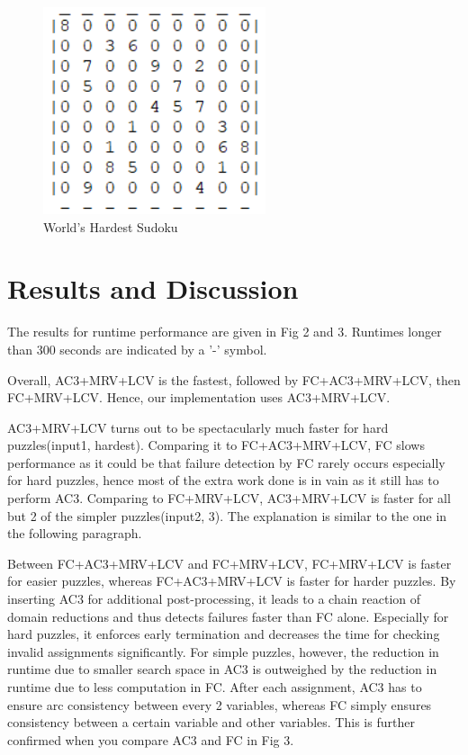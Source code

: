 \documentclass[runningheads]{llncs}
\begin{document}
\begin{figure}
\centering
\includegraphics[scale=0.9]{hardest_sudoku.png}
\caption{World's Hardest Sudoku}
\label{Figure 1}
\end{figure}

\section{Results and Discussion}

The results for runtime performance are given in Fig 2 and 3. Runtimes longer than 300 seconds are indicated by a '-' symbol. 

Overall, AC3+MRV+LCV is the fastest, followed by FC+AC3+MRV+LCV, then FC+MRV+LCV. Hence, our implementation uses AC3+MRV+LCV.  

AC3+MRV+LCV turns out to be spectacularly much faster for hard puzzles(input1, hardest). Comparing it to FC+AC3+MRV+LCV, FC slows performance as it could be that failure detection by FC rarely occurs especially for hard puzzles, hence most of the extra work done is in vain as it still has to perform AC3. Comparing to FC+MRV+LCV, AC3+MRV+LCV is faster for all but 2 of the simpler puzzles(input2, 3). The explanation is similar to the one in the following paragraph.

Between FC+AC3+MRV+LCV and FC+MRV+LCV, FC+MRV+LCV is faster for easier puzzles, whereas FC+AC3+MRV+LCV is faster for harder puzzles. By inserting AC3 for additional post-processing, it leads to a chain reaction of domain reductions and thus detects failures faster than FC alone. Especially for hard puzzles, it enforces early termination and decreases the time for checking invalid assignments significantly. For simple puzzles, however, the reduction in runtime due to smaller search space in AC3 is outweighed by the reduction in runtime due to less computation in FC. After each assignment, AC3 has to ensure arc consistency between every 2 variables, whereas FC simply ensures consistency between a certain variable and other variables. This is further confirmed when you compare AC3 and FC in Fig 3.
\end{document}
